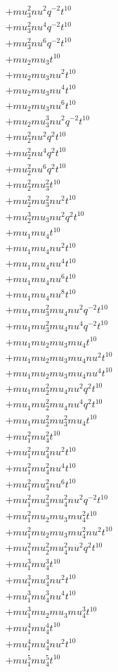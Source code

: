 \begin{align*}
  + mu_3^{2} nu^{2} q^{-2} t^{10} \\
  + mu_3^{2} nu^{4} q^{-2} t^{10} \\
  + mu_3^{2} nu^{6} q^{-2} t^{10} \\
  + mu_2 mu_3 t^{10} \\
  + mu_2 mu_3 nu^{2} t^{10} \\
  + mu_2 mu_3 nu^{4} t^{10} \\
  + mu_2 mu_3 nu^{6} t^{10} \\
  + mu_2 mu_3^{3} nu^{2} q^{-2} t^{10} \\
  + mu_2^{2} nu^{2} q^{2} t^{10} \\
  + mu_2^{2} nu^{4} q^{2} t^{10} \\
  + mu_2^{2} nu^{6} q^{2} t^{10} \\
  + mu_2^{2} mu_3^{2} t^{10} \\
  + mu_2^{2} mu_3^{2} nu^{2} t^{10} \\
  + mu_2^{3} mu_3 nu^{2} q^{2} t^{10} \\
  + mu_1 mu_4 t^{10} \\
  + mu_1 mu_4 nu^{2} t^{10} \\
  + mu_1 mu_4 nu^{4} t^{10} \\
  + mu_1 mu_4 nu^{6} t^{10} \\
  + mu_1 mu_4 nu^{8} t^{10} \\
  + mu_1 mu_3^{2} mu_4 nu^{2} q^{-2} t^{10} \\
  + mu_1 mu_3^{2} mu_4 nu^{4} q^{-2} t^{10} \\
  + mu_1 mu_2 mu_3 mu_4 t^{10} \\
  + mu_1 mu_2 mu_3 mu_4 nu^{2} t^{10} \\
  + mu_1 mu_2 mu_3 mu_4 nu^{4} t^{10} \\
  + mu_1 mu_2^{2} mu_4 nu^{2} q^{2} t^{10} \\
  + mu_1 mu_2^{2} mu_4 nu^{4} q^{2} t^{10} \\
  + mu_1 mu_2^{2} mu_3^{2} mu_4 t^{10} \\
  + mu_1^{2} mu_4^{2} t^{10} \\
  + mu_1^{2} mu_4^{2} nu^{2} t^{10} \\
  + mu_1^{2} mu_4^{2} nu^{4} t^{10} \\
  + mu_1^{2} mu_4^{2} nu^{6} t^{10} \\
  + mu_1^{2} mu_3^{2} mu_4^{2} nu^{2} q^{-2} t^{10} \\
  + mu_1^{2} mu_2 mu_3 mu_4^{2} t^{10} \\
  + mu_1^{2} mu_2 mu_3 mu_4^{2} nu^{2} t^{10} \\
  + mu_1^{2} mu_2^{2} mu_4^{2} nu^{2} q^{2} t^{10} \\
  + mu_1^{3} mu_4^{3} t^{10} \\
  + mu_1^{3} mu_4^{3} nu^{2} t^{10} \\
  + mu_1^{3} mu_4^{3} nu^{4} t^{10} \\
  + mu_1^{3} mu_2 mu_3 mu_4^{3} t^{10} \\
  + mu_1^{4} mu_4^{4} t^{10} \\
  + mu_1^{4} mu_4^{4} nu^{2} t^{10} \\
  + mu_1^{5} mu_4^{5} t^{10}
\end{align*}
